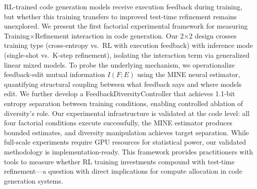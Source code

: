 RL-trained code generation models receive execution feedback during training, but whether this training transfers to improved test-time refinement remains unexplored. We present the first factorial experimental framework for measuring Training$\times$Refinement interaction in code generation. Our 2$\times$2 design crosses training type (cross-entropy vs.\ RL with execution feedback) with inference mode (single-shot vs.\ K-step refinement), isolating the interaction term via generalized linear mixed models. To probe the underlying mechanism, we operationalize feedback-edit mutual information $I(F;E)$ using the MINE neural estimator, quantifying structural coupling between what feedback says and where models edit. We further develop a FeedbackDiversityController that achieves 1.1-bit entropy separation between training conditions, enabling controlled ablation of diversity's role. Our experimental infrastructure is validated at the code level: all four factorial conditions execute successfully, the MINE estimator produces bounded estimates, and diversity manipulation achieves target separation. While full-scale experiments require GPU resources for statistical power, our validated methodology is implementation-ready. This framework provides practitioners with tools to measure whether RL training investments compound with test-time refinement---a question with direct implications for compute allocation in code generation systems.
